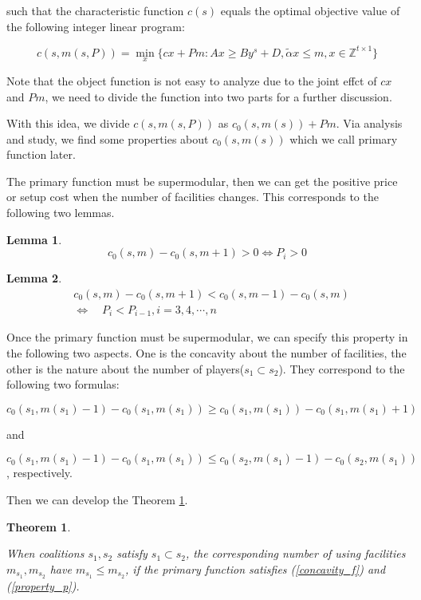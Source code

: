 \documentclass[UTF8]{article}
\newtheorem{thm}{\hspace{2em}Theorem}
\newtheorem{lem}{\hspace{2em}Lemma}
\begin{document}
such that the characteristic function $c(s)$ equals the optimal objective value of the following integer linear program:

\[
c(s,m(s,P))= \mathop{\min}_{x} \{ cx+Pm: Ax \geq By^s+D, \tilde{\alpha}x \leq m, x \in \mathbb{Z}^{t \times 1} \}
\]

Note that the object function is not easy to analyze due to the joint effct of $cx$ and $Pm$, we need to divide the function into two parts for a further discussion.

With this idea, we divide $c(s,m(s,P))$ as $c_0(s,m(s))+Pm $. Via analysis and study, we find some properties about $c_0(s,m(s)) $ which we call primary function later.

The primary function must be supermodular, then we can get the positive price or setup cost when the number of facilities changes. This corresponds to the following two lemmas.

\begin{lem}\label{lem2}
\[
c_0 (s,m) - c_0 (s,m+1) > 0 \Leftrightarrow P_i > 0
\]
\end{lem}

\begin{lem}\label{lem3}
\[
\begin{aligned}
&c_0 (s,m) - c_0 (s,m+1) < c_0 (s,m-1) - c_0 (s,m) \\
& \Leftrightarrow \quad P_i < P_{i-1} , i=3,4,\cdots,n
\end{aligned}
\]
\end{lem}


Once the primary function must be supermodular, we can specify this property in the following two aspects.
One is the concavity about the number of facilities,
the other is the nature about the number of players($s_1 \subset s_2$).
They correspond to the following two formulas:

\begin{equation}\label{concavity_f}
c_0(s_1,m(s_1)-1)-c_0(s_1,m(s_1)) \geq
  c_0(s_1,m(s_1))-c_0(s_1,m(s_1)+1)
\end{equation}

and

\begin{equation}\label{property_p}
	c_0(s_1,m(s_1)-1)-c_0(s_1,m(s_1)) \leq
	  c_0(s_2,m(s_1)-1)-c_0(s_2,m(s_1))
\end{equation}
, respectively.

Then we can develop the Theorem \ref{thm7}.

\begin{thm}\label{thm7}

When coalitions $s_1,s_2$ satisfy $s_1 \subset s_2$, the corresponding number of using facilities $ m_{s_1}, m_{s_2}$ have $m_{s_1} \leq m_{s_2}$, if the primary function satisfies  (\ref{concavity_f}) and (\ref{property_p}).
\end{thm}
\end{document}
